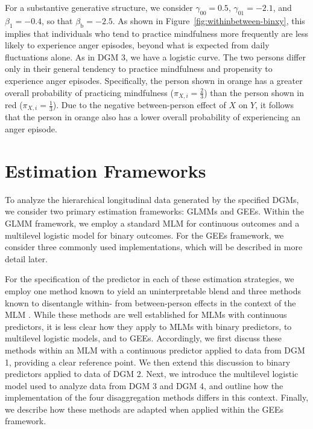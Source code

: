 \documentclass[stu]{apa7}
\begin{document}
For a substantive generative structure, we consider \( \gamma_{00} = 0.5 \), \( \gamma_{01} = -2.1 \), and \( \beta_1 = -0.4 \), so that \( \beta_\text{b} = -2.5 \). As shown in Figure~\ref{fig:withinbetween-binxy}, this implies that individuals who tend to practice mindfulness more frequently are less likely to experience anger episodes, beyond what is expected from daily fluctuations alone. As in DGM 3, we have a logistic curve. The two persons differ only in their general tendency to practice mindfulness and propensity to experience anger episodes. Specifically, the person shown in orange has a greater overall probability of practicing mindfulness (\( \pi_{X,i} = \frac{2}{3} \)) than the person shown in red (\( \pi_{X,i} = \frac{1}{3} \)). Due to the negative between-person effect of \( X \) on \( Y \), it follows that the person in orange also has a lower overall probability of experiencing an anger episode.

\section{Estimation Frameworks}

To analyze the hierarchical longitudinal data generated by the specified DGMs, we consider two primary estimation frameworks: GLMMs and GEEs. Within the GLMM framework, we employ a standard MLM for continuous outcomes and a multilevel logistic model for binary outcomes. For the GEEs framework, we consider three commonly used implementations, which will be described in more detail later. 

For the specification of the predictor in each of these estimation strategies, we employ one method known to yield an uninterpretable blend and three methods known to disentangle within- from between-person effects in the context of the MLM \parencite[]{curran_disaggregation_2011}. While these  methods are well established for MLMs with continuous predictors, it is less clear how they apply to MLMs with binary predictors, to multilevel logistic models, and to GEEs. Accordingly, we first discuss these methods within an MLM with a continuous predictor applied to data from DGM 1, providing a clear reference point. We then extend this discussion to binary predictors applied to data of DGM 2. Next, we introduce the multilevel logistic model used to analyze data from DGM 3 and DGM 4, and outline how the implementation of the four disaggregation methods differs in this context. Finally, we describe how these methods are adapted when applied within the GEEs framework. 
\end{document}
